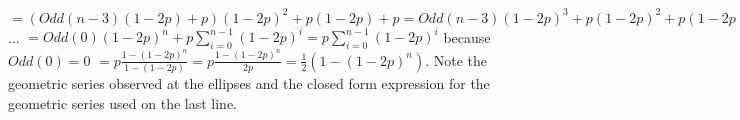 \documentclass[12pt]{article}
\begin{document}
\newline
\newline
$= (Odd(n-3)(1-2p) + p)(1-2p)^2 + p(1-2p) + p = Odd(n-3)(1-2p)^3 + p(1-2p)^2 + p(1-2p) + p$
\newline
\newline
...
\newline
\newline
$= Odd(0)(1-2p)^n + p \sum\limits_{i=0}^{n-1} (1-2p)^i = p \sum\limits_{i=0}^{n-1} (1-2p)^i$ because $Odd(0) = 0$
\newline
\newline
$= p \frac{1-(1-2p)^n}{1-(1-2p)} = p \frac{1-(1-2p)^n}{2p} = \frac{1}{2} (1 - (1-2p)^n)$.
\newline
\newline
Note the geometric series observed at the ellipses and the closed form expression for the geometric series 
used on the last line.


\end{document}
